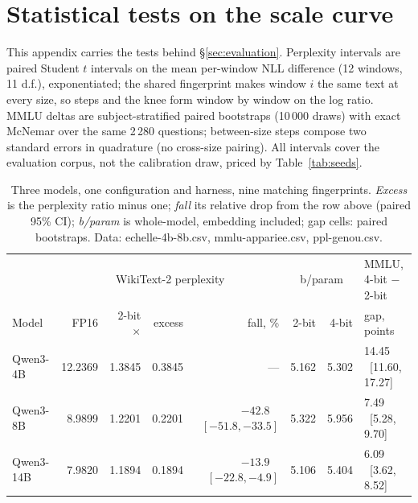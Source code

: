 \section{Statistical tests on the scale curve}
\label{app:scale}
\setlength{\intextsep}{2pt plus 2pt minus 1pt}
\setlength{\textfloatsep}{2pt plus 2pt minus 1pt}
\setlength{\floatsep}{2pt plus 2pt minus 1pt}

This appendix carries the tests behind \S\ref{sec:evaluation}. Perplexity
intervals are paired Student $t$ intervals on the mean per-window NLL
difference (12 windows, 11 d.f.), exponentiated; the shared fingerprint
makes window $i$ the same text at every size, so steps and the knee form
window by window on the log ratio. MMLU deltas are subject-stratified
paired bootstraps (10\,000 draws) with exact McNemar over the same 2\,280
questions; between-size steps compose two standard errors in quadrature (no
cross-size pairing). All intervals cover the evaluation corpus, not the
calibration draw, priced by Table~\ref{tab:seeds}.

\begin{table}[htbp]
\centering
\footnotesize
\setlength{\tabcolsep}{4pt}
\begin{tabular}{lrrrrrrl}
\toprule
 & \multicolumn{4}{c}{WikiText-2 perplexity} & \multicolumn{2}{c}{b/param} & MMLU, 4-bit $-$ 2-bit \\
\cmidrule(lr){2-5}\cmidrule(lr){6-7}\cmidrule(lr){8-8}
Model & FP16 & 2-bit $\times$ & excess & fall, \% & 2-bit & 4-bit & gap, points \\
\midrule
Qwen3-4B  & 12.2369 & 1.3845 & 0.3845 & --- & 5.162 & 5.302 & 14.45 \ [11.60, 17.27] \\
Qwen3-8B  & 8.9899  & 1.2201 & 0.2201 & $-42.8$ \ $[-51.8, -33.5]$ & 5.322 & 5.956 & 7.49 \ [5.28, 9.70] \\
Qwen3-14B & 7.9820  & 1.1894 & 0.1894 & $-13.9$ \ $[-22.8, -4.9]$ & 5.106 & 5.404 & 6.09 \ [3.62, 8.52] \\
\bottomrule
\end{tabular}
\caption{Three models, one configuration and harness, nine matching
fingerprints. \emph{Excess} is the perplexity ratio minus one; \emph{fall}
its relative drop from the row above (paired 95\% CI); \emph{b/param} is
whole-model, embedding included; gap cells: paired bootstraps. Data:
echelle-4b-8b.csv, mmlu-appariee.csv, ppl-genou.csv.}
\label{tab:scale}
\end{table}

